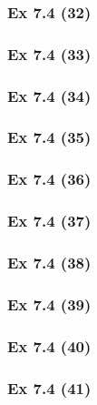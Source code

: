 \subsubsection{Ex 7.4 (32)}\label{sec:Ex_7.4.32}

\subsubsection{Ex 7.4 (33)}\label{sec:Ex_7.4.33}

\subsubsection{Ex 7.4 (34)}\label{sec:Ex_7.4.34}

\subsubsection{Ex 7.4 (35)}\label{sec:Ex_7.4.35}

\subsubsection{Ex 7.4 (36)}\label{sec:Ex_7.4.36}

\subsubsection{Ex 7.4 (37)}\label{sec:Ex_7.4.37}

\subsubsection{Ex 7.4 (38)}\label{sec:Ex_7.4.38}

\subsubsection{Ex 7.4 (39)}\label{sec:Ex_7.4.39}

\subsubsection{Ex 7.4 (40)}\label{sec:Ex_7.4.40}

\subsubsection{Ex 7.4 (41)}\label{sec:Ex_7.4.41}

